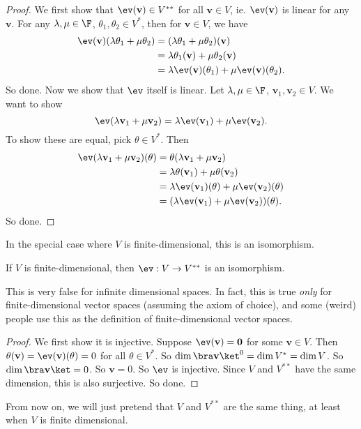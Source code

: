 \documentclass[a4paper]{article}
\begin{document}
\begin{proof}
  We first show that $\ev(\mathbf{v}) \in V^{**}$ for all $\mathbf{v}\in V$, ie. $\ev (\mathbf{v})$ is linear for any $\mathbf{v}$. For any $\lambda, \mu\in \F$, $\theta_1, \theta_2 \in V^*$, then for $\mathbf{v} \in V$, we have
  \begin{align*}
    \ev(\mathbf{v})(\lambda\theta_1 + \mu\theta_2) &= (\lambda\theta_1 + \mu\theta_2)(\mathbf{v}) \\
    &= \lambda\theta_1(\mathbf{v}) + \mu\theta_2(\mathbf{v}) \\
    &= \lambda\ev(\mathbf{v})(\theta_1) + \mu \ev(\mathbf{v})(\theta_2).
  \end{align*}
  So done. Now we show that $\ev$ itself is linear. Let $\lambda, \mu\in \F$, $\mathbf{v}_1, \mathbf{v}_2 \in V$. We want to show
  \[
    \ev(\lambda\mathbf{v}_1 + \mu \mathbf{v}_2) = \lambda \ev (\mathbf{v}_1) + \mu \ev(\mathbf{v}_2).
  \]
  To show these are equal, pick $\theta \in V^*$. Then
  \begin{align*}
    \ev(\lambda \mathbf{v}_1 + \mu \mathbf{v}_2)(\theta) &= \theta(\lambda\mathbf{v}_1 + \mu \mathbf{v}_2) \\
    &= \lambda\theta(\mathbf{v}_1) + \mu \theta(\mathbf{v}_2) \\
    &= \lambda \ev(\mathbf{v}_1)(\theta) + \mu \ev(\mathbf{v}_2)(\theta) \\
    &= (\lambda \ev(\mathbf{v}_1) + \mu \ev(\mathbf{v}_2))(\theta).
  \end{align*}
  So done.
\end{proof}
In the special case where $V$ is finite-dimensional, this is an isomorphism.
\begin{lemma}
  If $V$ is finite-dimensional, then $\ev: V \to V^{**}$ is an isomorphism.
\end{lemma}
This is very false for infinite dimensional spaces. In fact, this is true \emph{only} for finite-dimensional vector spaces (assuming the axiom of choice), and some (weird) people use this as the definition of finite-dimensional vector spaces.

\begin{proof}
  We first show it is injective. Suppose $\ev(\mathbf{v}) = \mathbf{0}$ for some $\mathbf{v}\in V$. Then $\theta (\mathbf{v}) = \ev (\mathbf{v})(\theta) = 0$ for all $\theta \in V^*$. So $\dim \bra \mathbf{v}\ket^0 = \dim V^* = \dim V$. So $\dim \bra \mathbf{v} \ket = 0$. So $\mathbf{v} = 0$. So $\ev$ is injective. Since $V$ and $V^{**}$ have the same dimension, this is also surjective. So done.
\end{proof}
From now on, we will just pretend that $V$ and $V^{**}$ are the same thing, at least when $V$ is finite dimensional.
\end{document}

